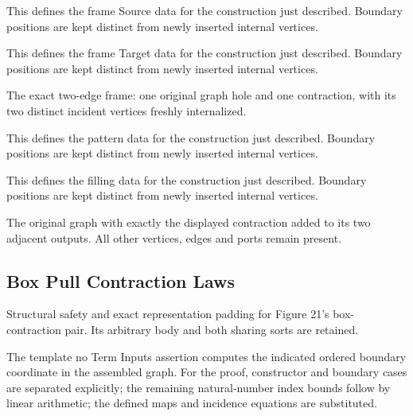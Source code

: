 This defines the frame Source data for the construction just described. Boundary positions are kept distinct from newly inserted internal vertices.
\par{}

This defines the frame Target data for the construction just described. Boundary positions are kept distinct from newly inserted internal vertices.
\par{}

The exact two-edge frame: one original graph hole and one contraction, with its two distinct incident vertices freshly internalized.
\par{}

This defines the pattern data for the construction just described. Boundary positions are kept distinct from newly inserted internal vertices.
\par{}

This defines the filling data for the construction just described. Boundary positions are kept distinct from newly inserted internal vertices.
\par{}

The original graph with exactly the displayed contraction added to its two adjacent outputs. All other vertices, edges and ports remain present.
\par{}

\subsection{Box Pull Contraction Laws}
Structural safety and exact representation padding for Figure 21's box-contraction pair. Its arbitrary body and both sharing sorts are retained.

The template no Term Inputs assertion computes the indicated ordered boundary coordinate in the assembled graph.
For the proof, constructor and boundary cases are separated explicitly; the remaining natural-number index bounds follow by linear arithmetic; the defined maps and incidence equations are substituted.
\par{}

